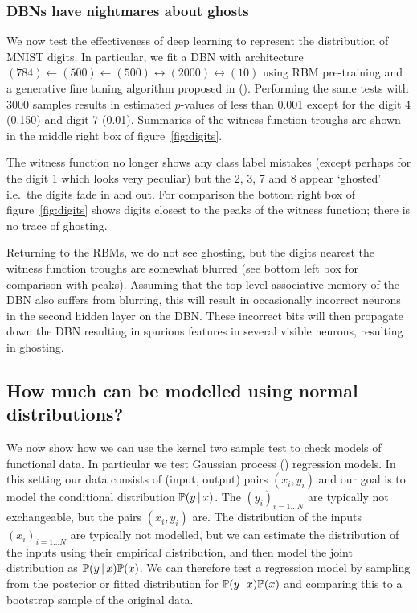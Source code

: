 \documentclass{article} %
\def\ie{i.e.\ }
\begin{document}
\subsubsection{DBNs have nightmares about ghosts}

We now test the effectiveness of deep learning to represent the distribution of MNIST digits.
In particular, we fit a DBN with architecture $(784)\leftarrow(500)\leftarrow(500)\leftrightarrow(2000)\leftrightarrow(10)$ using RBM pre-training and a generative fine tuning algorithm proposed in ().
Performing the same tests with 3000 samples results in estimated $p$-values of less than 0.001 except for the digit 4 (0.150) and digit 7 (0.01).
Summaries of the witness function troughs are shown in the middle right box of figure~\ref{fig:digits}.

The witness function no longer shows any class label mistakes (except perhaps for the digit 1 which looks very peculiar) but the 2, 3, 7 and 8 appear `ghosted' \ie the digits fade in and out.
For comparison the bottom right box of figure~\ref{fig:digits} shows digits closest to the peaks of the witness function; there is no trace of ghosting.

Returning to the RBMs, we do not see ghosting, but the digits nearest the witness function troughs are somewhat blurred (see bottom left box for comparison with peaks).
Assuming that the top level associative memory of the DBN also suffers from blurring, this will result in occasionally incorrect neurons in the second hidden layer on the DBN.
These incorrect bits will then propagate down the DBN resulting in spurious features in several visible neurons, resulting in ghosting.

\subsection{How much can be modelled using normal distributions?}


We now show how we can use the kernel two sample test to check models of functional data.
In particular we test Gaussian process () regression models.
In this setting our data consists of (input, output) pairs $(x_i, y_i)$ and our goal is to model the conditional distribution $\mathbb{P}(y\,|\, x)$.
The $(y_i)_{i=1\ldots N}$ are typically not exchangeable, but the pairs $(x_i, y_i)$ are.
The distribution of the inputs $(x_i)_{i=1\ldots N}$ are typically not modelled, but we can estimate the distribution of the inputs using their empirical distribution, and then model the joint distribution as $\mathbb{P}(y\,|\, x)\mathbb{P}(x)$.
We can therefore test a regression model by sampling from the posterior or fitted distribution for $\mathbb{P}(y\,|\, x)\mathbb{P}(x)$ and comparing this to a bootstrap sample of the original data.
\end{document}
